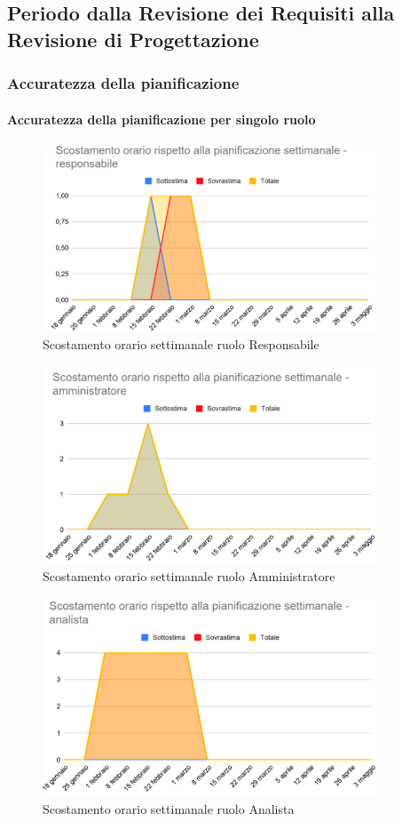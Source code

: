 	\subsection{Periodo dalla Revisione dei Requisiti alla Revisione di Progettazione}
		\subsubsection{Accuratezza della pianificazione}
		\paragraph{Accuratezza della pianificazione per singolo ruolo}
		\begin{figure}[H]
	\centering
	\includegraphics[width=10cm]{res/images/responsabile}
	\caption{Scostamento orario settimanale ruolo Responsabile}
	\label{fig:Scostamento orario settimanale ruolo Responsabile}
\end{figure}
\begin{figure}[H]
	\centering
	\includegraphics[width=10cm]{res/images/amministratore}
	\caption{Scostamento orario settimanale ruolo Amministratore}
	\label{fig:Scostamento orario settimanale ruolo Amministratore}
\end{figure}
\begin{figure}[H]
	\centering
	\includegraphics[width=10cm]{res/images/analista}
	\caption{Scostamento orario settimanale ruolo Analista}
	\label{fig:Scostamento orario settimanale ruolo Analista}
\end{figure}
